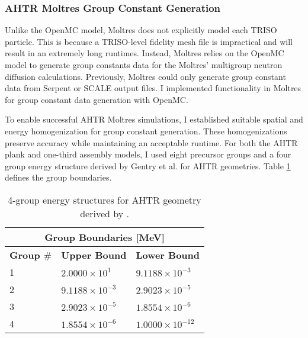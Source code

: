 \subsubsection{AHTR Moltres Group Constant Generation}
\label{sec:ahtr-moltres-group-constant-gen}
Unlike the OpenMC model, Moltres does not explicitly model each \gls{TRISO}
particle. 
This is because a TRISO-level fidelity mesh file is impractical and will result in an extremely 
long runtimes. 
Instead, Moltres relies on the OpenMC model to generate group constants data for the 
Moltres' multigroup neutron diffusion calculations. 
Previously, Moltres could only generate group constant data from Serpent 
\cite{leppanen_serpent_2014} or SCALE \cite{bucholz_scale:_1982} output files. 
I implemented functionality in Moltres for group constant data generation with 
OpenMC. 

To enable successful \gls{AHTR} Moltres simulations, I established suitable spatial and 
energy homogenization for group constant generation. 
These homogenizations preserve accuracy while maintaining an acceptable runtime.
For both the \gls{AHTR} plank and one-third assembly models, I used eight precursor groups 
and a four group energy structure derived by Gentry et al. \cite{gentry_development_2016} 
for \gls{AHTR} geometries. 
Table \ref{tab:energy_structures} defines the group boundaries. 
\begin{table}[]
    \centering
    \onehalfspacing
    \caption{4-group energy structures for \acrfull{AHTR} geometry 
    derived by \cite{gentry_development_2016}.}
	\label{tab:energy_structures}
    \footnotesize
    \begin{tabular}{lll}
    \hline
    \multicolumn{3}{c}{\textbf{Group Boundaries [MeV]}} \\ 
    \hline
    \textbf{Group $\#$}& \textbf{Upper Bound} & \textbf{Lower Bound}  \\
    \hline 
    1 & $2.0000\times 10^1$ & $9.1188\times 10^{-3}$ \\ 
    2 & $9.1188\times 10^{-3}$ & $2.9023\times 10^{-5}$\\
    3 & $2.9023\times 10^{-5}$ & $1.8554\times 10^{-6}$\\
    4 & $1.8554\times 10^{-6}$ & $1.0000\times 10^{-12}$\\
    \hline
    \end{tabular}
\end{table}

